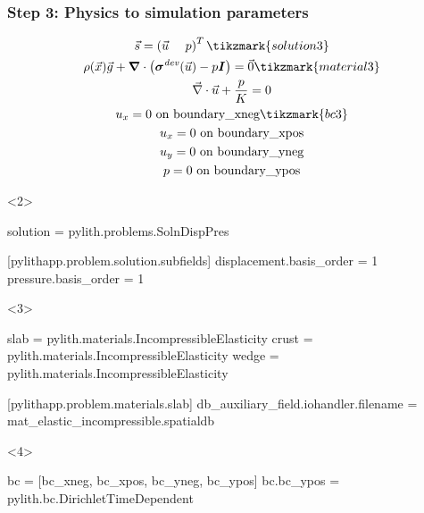 \documentclass[aspectratio=169]{beamer}
\begin{document}
\begin{frame}[t,fragile]
  \frametitle{Step 3: Physics to simulation parameters}
  \summary{}

  \begin{minipage}[t]{0.3\textwidth}
    {\scriptsize
    \begin{gather*}
      \vec{s} = \left( \vec{u} \quad \ p \right)^T \tikzmark{solution3}\\
      \rho(\vec{x})\vec{g} + \tensor{\nabla} \cdot \left(\tensor{\sigma}^\mathit{dev}(\vec{u}) - p\tensor{I}\right) = \vec{0} \tikzmark{material3}\\
      \vec{\nabla} \cdot \vec{u} + \frac{p}{K} = 0 \\
      u_x = 0 \text{ on boundary\_xneg} \tikzmark{bc3}\\
      u_x = 0 \text{ on boundary\_xpos} \\
      u_y = 0 \text{ on boundary\_yneg} \\
      p = 0 \text{ on boundary\_ypos}
    \end{gather*}}
  \end{minipage}
  \hfill
  \begin{minipage}[t]{0.67\textwidth}
    \begin{onlyenv}<2>
      \begin{cfgcode}
        solution = pylith.problems.SolnDispPres

        [pylithapp.problem.solution.subfields]
        displacement.basis_order = 1
        pressure.basis_order = 1
      \end{cfgcode}
    \end{onlyenv}
    \begin{onlyenv}<3>
      \begin{cfgcode}
        slab = pylith.materials.IncompressibleElasticity
        crust = pylith.materials.IncompressibleElasticity
        wedge = pylith.materials.IncompressibleElasticity

        [pylithapp.problem.materials.slab]
        db_auxiliary_field.iohandler.filename = mat_elastic_incompressible.spatialdb
      \end{cfgcode}
    \end{onlyenv}
    \begin{onlyenv}<4>
      \begin{cfgcode}
        bc = [bc_xneg, bc_xpos, bc_yneg, bc_ypos]
        bc.bc_ypos = pylith.bc.DirichletTimeDependent


\end{cfgcode}
\end{onlyenv}
\end{minipage}
\end{frame}
\end{document}
